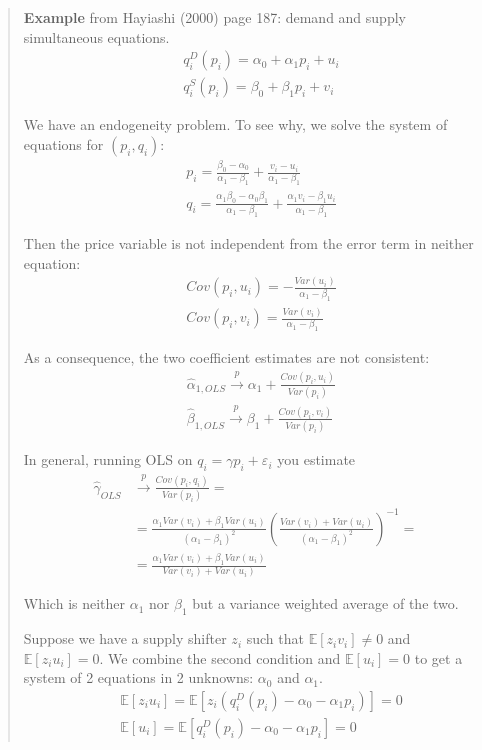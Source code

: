 \documentclass[12pt,]{book}
\begin{document}
\begin{quote}
\textbf{Example} from Hayiashi (2000) page 187: demand and supply simultaneous equations.
\[
\begin{aligned}
& q_i^D(p_i) = \alpha_0 + \alpha_1 p_i + u_i \\
& q_i^S(p_i) = \beta_0 + \beta_1 p_i + v_i 
\end{aligned}
\]

We have an endogeneity problem. To see why, we solve the system of equations for \((p_i, q_i)\):
\[
\begin{aligned}
& p_i = \frac{\beta_0 - \alpha_0}{\alpha_1 - \beta_1} + \frac{v_i - u_i}{\alpha_1 - \beta_1 } \\
& q_i = \frac{\alpha_1\beta_0 - \alpha_0 \beta_1}{\alpha_1 - \beta_1} + \frac{\alpha_1 v_i - \beta_1 u_i}{\alpha_1 - \beta_1 } 
\end{aligned}
\]

Then the price variable is not independent from the error term in neither equation:
\[
\begin{aligned}
& Cov(p_i, u_i) = - \frac{Var(u_i)}{\alpha_1 - \beta_1 } \\
& Cov(p_i, v_i) = \frac{Var(v_i)}{\alpha_1 - \beta_1 } 
\end{aligned}
\]

As a consequence, the two coefficient estimates are not consistent:
\[
\begin{aligned}
& \hat{\alpha} _ {1, OLS} \overset{p}{\to} \alpha_1 + \frac{Cov(p_i, u_i)}{Var(p_i)} \\
& \hat{\beta} _ {1, OLS} \overset{p}{\to} \beta_1 + \frac{Cov(p_i, v_i)}{Var(p_i)} 
\end{aligned}
\]

In general, running OLS on \(q_i = \gamma p_i + \varepsilon_i\) you estimate
\[
\begin{aligned}
\hat{\gamma} _ {OLS} &\overset{p}{\to} \frac{Cov(p_i, q_i)}{Var(p_i)} = \\
&= \frac{\alpha_1 Var(v_i) + \beta_1 Var(u_i)}{(\alpha_1 - \beta_1)^2} \left( \frac{Var(v_i) + Var(u_i)}{(\alpha_1 - \beta_1)^2} \right)^{-1} = \\
&= \frac{\alpha_1 Var(v_i) + \beta_1 Var(u_i)}{Var(v_i) + Var(u_i)} 
\end{aligned}
\]

Which is neither \(\alpha_1\) nor \(\beta_1\) but a variance weighted average of the two.

Suppose we have a supply shifter \(z_i\) such that \(\mathbb E[z_i v_i] \neq 0\) and \(\mathbb E[z_i u_i] = 0\). We combine the second condition and \(\mathbb E[u_i] = 0\) to get a system of 2 equations in 2 unknowns: \(\alpha_0\) and \(\alpha_1\).
\[
\begin{aligned}
& \mathbb E[z_i u_i] = \mathbb E[ z_i (q_i^D(p_i) - \alpha_0 - \alpha_1 p_i) ] = 0 \\
& \mathbb E[u_i] = \mathbb E[q_i^D(p_i) - \alpha_0 - \alpha_1 p_i] = 0  
\end{aligned}
\]


\end{quote}
\end{document}
